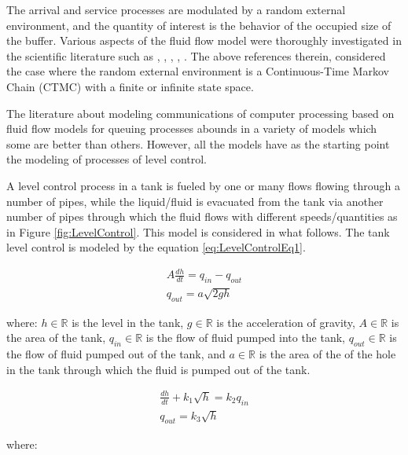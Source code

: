 The arrival and service processes are modulated by a random external environment, and the quantity of interest is the behavior of the occupied size of the buffer. Various aspects of the fluid flow model were thoroughly investigated in the scientific literature such as \cite{flow:anick82}, \cite{flow:mitra88}, \cite{flow:stern91}, \cite{flow:Kulkarni98}, \cite{flow:sericola99}. The above references therein, considered the case where the random external environment is a Continuous-Time Markov Chain (CTMC) with a finite or infinite state space.

The literature about modeling communications of computer processing based on fluid flow models for queuing processes abounds in a variety of models which some are better than others. However, all the models have as the starting point the modeling of processes of level control.

A level control process in a tank is fueled by one or many flows flowing through a number of pipes, while the liquid/fluid is evacuated from the tank via another number of pipes through which the fluid flows with different speeds/quantities as in Figure \ref{fig:LevelControl}. This model is considered in what follows. The tank level control is modeled by the equation \ref{eq:LevelControlEq1}.

\begin{equation}
\begin{array}{l}
A \frac{dh}{dt} = q_{in}-q_{out} \\
q_{out}= a\sqrt{2gh}
 \label{eq:LevelControlEq1}
\end{array}
\end{equation}

where: $h \in \mathbb{R}$ is the level in the tank, $g \in \mathbb{R}$ is the acceleration of gravity, $A \in \mathbb{R}$ is the area of the tank, $q_{in} \in \mathbb{R}$ is the flow of fluid pumped into the tank, $q_{out} \in \mathbb{R}$ is the flow of fluid pumped out of the tank, and $a \in \mathbb{R}$ is the area of the of the hole in the tank through which the fluid is pumped out of the tank.

\begin{equation}
\begin{array}{l}
\frac{dh}{dt} + k_{1}\sqrt{h} = k_{2}q_{in} \\
q_{out}= k_{3}\sqrt{h}
\end{array}
 \label{eq:LevelControlEq2}
\end{equation}

where:

